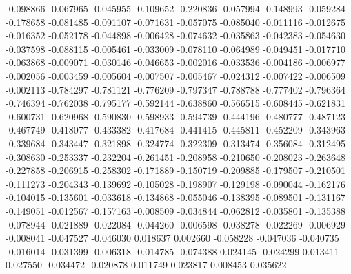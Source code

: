 -0.098866
-0.067965
-0.045955
-0.109652
-0.220836
-0.057994
-0.148993
-0.059284
-0.178658
-0.081485
-0.091107
-0.071631
-0.057075
-0.085040
-0.011116
-0.012675
-0.016352
-0.052178
-0.044898
-0.006428
-0.074632
-0.035863
-0.042383
-0.054630
-0.037598
-0.088115
-0.005461
-0.033009
-0.078110
-0.064989
-0.049451
-0.017710
-0.063868
-0.009071
-0.030146
-0.046653
-0.002016
-0.033536
-0.004186
-0.006977
-0.002056
-0.003459
-0.005604
-0.007507
-0.005467
-0.024312
-0.007422
-0.006509
-0.002113
-0.784297
-0.781121
-0.776209
-0.797347
-0.788788
-0.777402
-0.796364
-0.746394
-0.762038
-0.795177
-0.592144
-0.638860
-0.566515
-0.608445
-0.621831
-0.600731
-0.620968
-0.590830
-0.598933
-0.594739
-0.444196
-0.480777
-0.487123
-0.467749
-0.418077
-0.433382
-0.417684
-0.441415
-0.445811
-0.452209
-0.343963
-0.339684
-0.343447
-0.321898
-0.324774
-0.322309
-0.313474
-0.356084
-0.312495
-0.308630
-0.253337
-0.232204
-0.261451
-0.208958
-0.210650
-0.208023
-0.263648
-0.227858
-0.206915
-0.258302
-0.171889
-0.150719
-0.209885
-0.179507
-0.210501
-0.111273
-0.204343
-0.139692
-0.105028
-0.198907
-0.129198
-0.090044
-0.162176
-0.104015
-0.135601
-0.033618
-0.134868
-0.055046
-0.138395
-0.089501
-0.131167
-0.149051
-0.012567
-0.157163
-0.008509
-0.034844
-0.062812
-0.035801
-0.135388
-0.078944
-0.021889
-0.022084
-0.044260
-0.006598
-0.038278
-0.022269
-0.006929
-0.008041
-0.047527
-0.046030
0.018637
0.002660
-0.058228
-0.047036
-0.040735
-0.016014
-0.031399
-0.006318
-0.014785
-0.074388
0.024145
-0.024299
0.013411
0.027550
-0.034472
-0.020878
0.011749
0.023817
0.008453
0.035622
